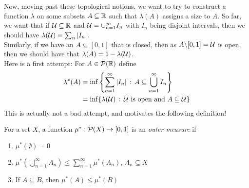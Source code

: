 Now, moving past these topological notions, we want to try to construct a function $\lambda$ on some subsets $A \subseteq \R$ such that $\lambda(A)$ assigns a size to $A$. So far, we want that if $\cal{U} \subseteq \R$ and $\cal{U} = \cup_{n = 1}^{\infty} I_{n}$ with $I_{n}$ being disjoint intervals, then we should have $\lambda(\cal{U}) = \sum_{n} \abs{I_{n}}$.\\

Similarly, if we have an $A \subseteq [0, 1]$ that is closed, then as $A \backslash [0, 1] = \cal{U}$ is open, then we should have that $\lambda(A) = 1 - \lambda(\cal{U})$. \\

Here is a first attempt: For $A \in \P(\R)$ define
\begin{align*}
    \lambda^{*}(A) &= \inf\left\{\sum_{n = 1}^{\infty} \abs{I_{n}} \col A \subseteq \bigcup_{n = 1}^{\infty} I_{n}\right\}\\
    &= \inf\{\lambda(\cal{U}) \col \cal{U} \text{ is open and } A \subseteq \cal{U}\}
\end{align*}
This is actually not a bad attempt, and motivates the following definition!

\begin{definition}
    For a set $X$, a function $\mu^{*} : \P(X) \to [0, 1]$ is an \emph{outer measure} if
    \begin{enumerate}
        \item $\mu^{*}(\emptyset) = 0$
        \item $\mu^{*}\left(\bigcup_{n = 1}^{\infty} A_n\right) \leq \sum_{n = 1}^{\infty} \mu^{*}(A_n)$, $A_n \subseteq X$
        \item If $A \subseteq B$, then $\mu^{*}(A) \leq \mu^{*}(B)$
    \end{enumerate}
\end{definition}

